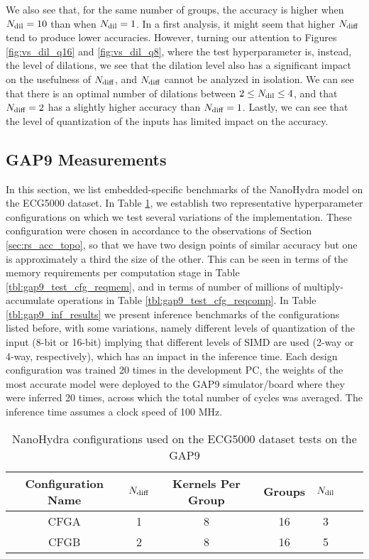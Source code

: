We also see that, for the same number of groups, the accuracy is higher when $N\sb{\text{dil}} = 10$ than when $N\sb{\text{dil}} = 1$.
In a first analysis, it might seem that higher $N\sb{\text{diff}}$ tend to produce lower accuracies. 
However, turning our attention to Figures \ref{fig:vs_dil_q16} and \ref{fig:vs_dil_q8}, where the test hyperparameter is, instead, the level of dilations,
we see that the dilation level also has a significant impact on the usefulness of $N\sb{\text{diff}}$, and $N\sb{\text{diff}}$ cannot be analyzed in isolation.
We can see that there is an optimal number of dilations between $2 \leq N\sb{\text{dil}} \leq 4$, and that $N\sb{\text{diff}} = 2$ has a slightly higher accuracy than $N\sb{\text{diff}} = 1$.
Lastly, we can see that the level of quantization of the inputs has limited impact on the accuracy.

\subsection{GAP9 Measurements}\label{sec:rs_gap9_meas}
In this section, we list embedded-specific benchmarks of the NanoHydra model on the ECG5000 dataset. 
In Table \ref{tbl:gap9_test_cfg}, we establish two representative hyperparameter configurations on which we test several variations of the implementation.
These configuration were chosen in accordance to the observations of Section \ref{sec:rs_acc_topo}, so that we have two design points of similar accuracy but one is approximately
a third the size of the other. This can be seen in terms of the memory requirements per computation stage in Table \ref{tbl:gap9_test_cfg_reqmem}, and in terms of number of millions of
multiply-accumulate operations in Table \ref{tbl:gap9_test_cfg_reqcomp}. In Table \ref{tbl:gap9_inf_results} we present inference benchmarks of the configurations listed before, with some
variations, namely different levels of quantization of the input (8-bit or 16-bit) implying that different levels of SIMD are used (2-way or 4-way, respectively), which has an impact
in the inference time. Each design configuration was trained 20 times in the development PC, the weights of the most accurate model were deployed to the GAP9 simulator/board where they were inferred 20 times,
across which the total number of cycles was averaged. The inference time assumes a clock speed of 100 MHz.

\begin{table}[p!]
    \centerfloat
    \begin{tabular}{ c c c c c c c }
    \toprule
    \textbf{Configuration Name} & $N\sb{\text{diff}}$ & \textbf{Kernels Per Group} & \textbf{Groups} & $N\sb{\text{dil}}$ \\
    \midrule
    CFGA & 1 & 8 & 16 & 3 \\
    CFGB & 2 & 8 & 16 & 5 \\
    \bottomrule
    \end{tabular}
    \caption{NanoHydra configurations used on the ECG5000 dataset tests on the GAP9}%
    \label{tbl:gap9_test_cfg}
\end{table}

